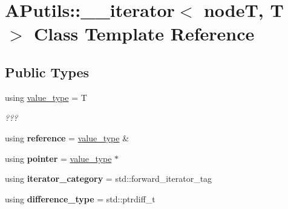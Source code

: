 \hypertarget{class_a_putils_1_1____iterator}{}\section{A\+Putils\+:\+:\+\_\+\+\_\+iterator$<$ nodeT, T $>$ Class Template Reference}
\label{class_a_putils_1_1____iterator}
\subsection*{Public Types}
\begin{DoxyCompactItemize}
\item 
\mbox{\label{class_a_putils_1_1____iterator_a81ef6b09ff94c44ba7917ec760a91cb1}} 
using \hyperlink{class_a_putils_1_1____iterator_a81ef6b09ff94c44ba7917ec760a91cb1}{value\+\_\+type} = T
\begin{DoxyCompactList}\small\item\em ??? \end{DoxyCompactList}\item 
\mbox{\label{class_a_putils_1_1____iterator_a300d792bf91a5ed81878ff8420ad3970}} 
using {\bfseries reference} = \hyperlink{class_a_putils_1_1____iterator_a81ef6b09ff94c44ba7917ec760a91cb1}{value\+\_\+type} \&
\item 
\mbox{\label{class_a_putils_1_1____iterator_a15486c09209b0360be0a9f08b654fc77}} 
using {\bfseries pointer} = \hyperlink{class_a_putils_1_1____iterator_a81ef6b09ff94c44ba7917ec760a91cb1}{value\+\_\+type} $\ast$
\item 
\mbox{\label{class_a_putils_1_1____iterator_af5015512657586650d9a0f18dcdfbdf3}} 
using {\bfseries iterator\+\_\+category} = std\+::forward\+\_\+iterator\+\_\+tag
\item 
\mbox{\label{class_a_putils_1_1____iterator_abbea03f051f2134f7e6e66d4da2db392}} 
using {\bfseries difference\+\_\+type} = std\+::ptrdiff\+\_\+t
\end{DoxyCompactItemize}
